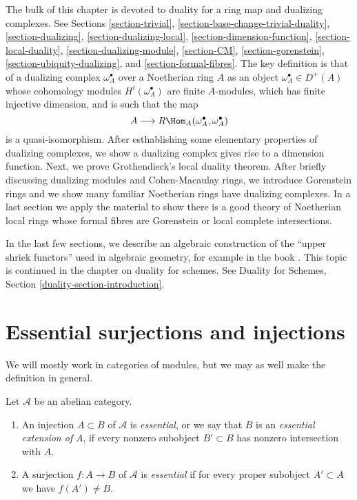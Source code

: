 \medskip\noindent
The bulk of this chapter is devoted to duality for a ring map and
dualizing complexes. See
Sections \ref{section-trivial},
\ref{section-base-change-trivial-duality},
\ref{section-dualizing},
\ref{section-dualizing-local},
\ref{section-dimension-function},
\ref{section-local-duality},
\ref{section-dualizing-module},
\ref{section-CM},
\ref{section-gorenstein},
\ref{section-ubiquity-dualizing}, and
\ref{section-formal-fibres}.
The key definition is that of a dualizing complex
$\omega_A^\bullet$ over a Noetherian ring $A$ as an object
$\omega_A^\bullet \in D^{+}(A)$ whose cohomology modules
$H^i(\omega_A^\bullet)$ are finite $A$-modules, which has
finite injective dimension, and is such that the map
$$
A \longrightarrow R\Hom_A(\omega_A^\bullet, \omega_A^\bullet)
$$
is a quasi-isomorphism. After esthablishing some elementary properties
of dualizing complexes, we show a dualizing complex gives rise to a
dimension function. Next, we prove Grothendieck's local duality theorem.
After briefly discussing dualizing modules and Cohen-Macaulay rings,
we introduce Gorenstein rings and we show many familiar Noetherian
rings have dualizing complexes. In a last section we apply the material
to show there is a good theory of Noetherian local rings whose formal fibres
are Gorenstein or local complete intersections.

\medskip\noindent
In the last few sections, we describe an algebraic construction of
the ``upper shriek functors'' used in algebraic geometry, for example
in the book \cite{RD}. This topic is continued in the chapter on
duality for schemes. See
Duality for Schemes, Section \ref{duality-section-introduction}.







\section{Essential surjections and injections}
\label{section-essential}

\noindent
We will mostly work in categories of modules, but we may as well make
the definition in general.

\begin{definition}
\label{definition-essential}
Let $\mathcal{A}$ be an abelian category.
\begin{enumerate}
\item An injection $A \subset B$ of $\mathcal{A}$ is {\it essential},
or we say that $B$ is an {\it essential extension of} $A$,
if every nonzero subobject $B' \subset B$ has nonzero intersection with $A$.
\item A surjection $f : A \to B$ of $\mathcal{A}$ is {\it essential}
if for every proper subobject $A' \subset A$ we have $f(A') \not = B$.
\end{enumerate}
\end{definition}

